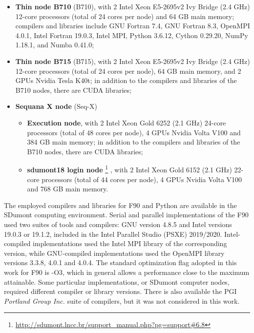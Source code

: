 \begin{itemize}

\item \textbf{Thin node B710} (B710), with 2 Intel Xeon E5-2695v2 Ivy Bridge (2.4 GHz) 12-core processors (total of 24 cores per node) and 64 GB main memory; compilers and libraries include GNU Fortran 7.4, GNU Fortran 8.3, OpenMPI 4.0.1, Intel Fortran 19.0.3, Intel MPI, Python 3.6.12, Cython 0.29.20, NumPy 1.18.1, and  Numba 0.41.0;

\item \textbf{Thin node B715} (B715), with 2 Intel Xeon E5-2695v2 Ivy Bridge (2.4 GHz) 12-core processors (total of 24 cores per node), 64 GB main memory, and 2 GPUs Nvidia Tesla K40t; in addition to the compilers and libraries of the B710 nodes, there are CUDA libraries;

\item \textbf{Sequana X node} (Seq-X)

    \begin{itemize}
    
    \item \textbf{Execution node}, with 2 Intel Xeon Gold 6252 (2.1 GHz) 24-core processors (total of 48 cores per node), 4 GPUs Nvidia Volta V100 and 384 GB main memory; in addition to the compilers and libraries of the B710 nodes, there are CUDA libraries;
    
    \item \textbf{sdumont18 login node} \footnote{\url{http://sdumont.lncc.br/support_manual.php?pg=support\#6.8}} , with 2 Intel Xeon Gold 6152 (2.1 GHz) 22-core processors (total of 44 cores per node), 4 GPUs Nvidia Volta V100 and 768 GB main memory.
    
    \end{itemize}

\end{itemize}

The employed compilers and libraries for F90 and Python are available in the SDumont computing environment. Serial and parallel implementations of the F90 used two suites of tools and compilers: GNU version 4.8.5 and Intel versions 19.0.3 or 19.1.2, included in the Intel Parallel Studio (PSXE) 2019/2020. Intel-compiled implementations used the Intel MPI library of the corresponding version, while GNU-compiled implementations used the OpenMPI library versions 3.3.8, 4.0.1 and 4.0.4. The standard optimization flag adopted in this work for F90 is -O3, which in general allows a performance close to the maximum attainable. Some particular implementations, or SDumont computer nodes, required different compiler or library versions. There is also available the PGI \textit {Portland Group Inc.} suite of compilers, but it was not considered in this work. 

